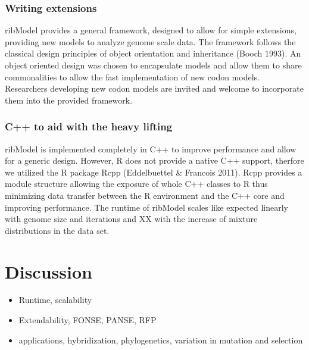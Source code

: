 \documentclass{bioinfo}
\newcommand{\package}{ribModel } %
\begin{document}
\subsubsection*{Writing extensions}
\package provides a general framework, designed to allow for simple extensions, providing new models to analyze genome scale data. 
The framework follows the classical design principles of object orientation and inheritance (Booch 1993). 
An object oriented design was chosen to encapsulate models and allow them to share commonalities to allow the fast implementation of new codon models. 
Researchers developing new codon models are invited and welcome to incorporate them into the provided framework.

\subsubsection*{C++ to aid with the heavy lifting}
\package is implemented completely in C++ to improve performance and allow for a generic design.
However, R does not provide a native C++ support, therfore we utilized the R package Rcpp (Eddelbuettel \& Francois 2011). 
Rcpp provides a module structure allowing the exposure of whole C++ classes to R thus minimizing data transfer between the R environment and the C++ core and improving performance. 
The runtime of \package scales like expected linearly with genome size and iterations and XX with the increase of mixture distributions in the data set.

\section*{Discussion}
\begin{itemize}
\item Runtime, scalability
\item Extendability, FONSE, PANSE, RFP
\item applications, hybridization, phylogenetics, variation in mutation and selection
\end{itemize}



%
%
\end{document}
